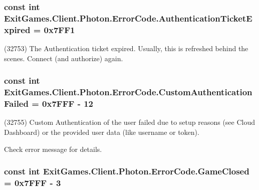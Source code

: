\subsubsection[{\texorpdfstring{Authentication\+Ticket\+Expired}{AuthenticationTicketExpired}}]{\setlength{\rightskip}{0pt plus 5cm}const int Exit\+Games.\+Client.\+Photon.\+Error\+Code.\+Authentication\+Ticket\+Expired = 0x7\+F\+F1}\hypertarget{class_exit_games_1_1_client_1_1_photon_1_1_error_code_a47cd3a6d5d9453e152026f3c9cec5a89}{}\label{class_exit_games_1_1_client_1_1_photon_1_1_error_code_a47cd3a6d5d9453e152026f3c9cec5a89}


(32753) The Authentication ticket expired. Usually, this is refreshed behind the scenes. Connect (and authorize) again.

\subsubsection[{\texorpdfstring{Custom\+Authentication\+Failed}{CustomAuthenticationFailed}}]{\setlength{\rightskip}{0pt plus 5cm}const int Exit\+Games.\+Client.\+Photon.\+Error\+Code.\+Custom\+Authentication\+Failed = 0x7\+F\+F\+F -\/ 12}\hypertarget{class_exit_games_1_1_client_1_1_photon_1_1_error_code_a6b1fa4a285add5e81b8bda9dd343e215}{}\label{class_exit_games_1_1_client_1_1_photon_1_1_error_code_a6b1fa4a285add5e81b8bda9dd343e215}


(32755) Custom Authentication of the user failed due to setup reasons (see Cloud Dashboard) or the provided user data (like username or token). 

Check error message for details. 
\subsubsection[{\texorpdfstring{Game\+Closed}{GameClosed}}]{\setlength{\rightskip}{0pt plus 5cm}const int Exit\+Games.\+Client.\+Photon.\+Error\+Code.\+Game\+Closed = 0x7\+F\+F\+F -\/ 3}\hypertarget{class_exit_games_1_1_client_1_1_photon_1_1_error_code_ae684a99ed82da84e00412c0e24c37dd7}{}\label{class_exit_games_1_1_client_1_1_photon_1_1_error_code_ae684a99ed82da84e00412c0e24c37dd7}



